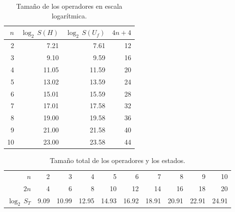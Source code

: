 \begin{ejemplo}
\begin{table}[h]
	\centering
	\begin{tabular}{*{4}{r}}
		\toprule
		$n$ & $\log_2 \, S(H)$ & $\log_2 \, S(U_f)$ & $4n+4$ \\
		\midrule
		2 	& 7.21	& 7.61	& 12\\
		3 	& 9.10	& 9.59	& 16\\
		4 	& 11.05	& 11.59	& 20\\
		5 	& 13.02	& 13.59	& 24\\
		6 	& 15.01	& 15.59	& 28\\
		7 	& 17.01	& 17.58	& 32\\
		8 	& 19.00	& 19.58	& 36\\
		9 	& 21.00	& 21.58	& 40\\
		10 	& 23.00	& 23.58	& 44\\
		\bottomrule
	\end{tabular}
	\caption{Tamaño de los operadores en escala logarítmica.}
\end{table}



\begin{table}[h]
	\centering
	\begin{tabular}{*{10}{r}}
		\toprule
$n$ & 2	& 3	& 4	& 5	& 6	& 7	& 8	& 9	& 10 \\
$2n$& 4	& 6	& 8	& 10	& 12	& 14	& 16	& 18	& 20 \\
$\log_2 \, S_T$ & 9.09	& 10.99	& 12.95	& 14.93	& 16.92	& 18.91	& 20.91	& 22.91	
& 24.91 \\
		\bottomrule
	\end{tabular}
	\caption{Tamaño total de los operadores y los estados.}
\end{table}


\end{ejemplo}



